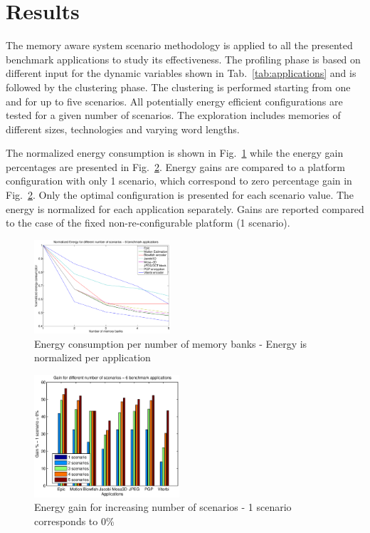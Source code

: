 \documentclass[a4paper,conference]{IEEEtran}
\begin{document}
\section{Results}
\label{sec:results}

The memory aware system scenario methodology is applied to all the presented benchmark applications to study its effectiveness. The profiling phase is based on different input for the dynamic variables shown in Tab.~\ref{tab:applications} and is followed by the clustering phase. The clustering is performed starting from one and for up to five scenarios. All potentially energy efficient configurations are tested for a given number of scenarios. The exploration includes memories of different sizes, technologies and varying word lengths. 

The normalized energy consumption is shown in Fig.~\ref{fig:energy} while the energy gain percentages are presented in Fig.~\ref{fig:gains}. Energy gains are compared to a platform configuration with only 1 scenario, which correspond to zero percentage gain in Fig.~\ref{fig:gains}. Only the optimal configuration is presented for each scenario value. The energy is normalized for each application separately. Gains are reported compared to the case of the fixed non-re-configurable platform (1 scenario).

\begin{figure}[!t]
\centering
\includegraphics[width=0.45\textwidth]{Images/6apps.eps}
\caption{Energy consumption per number of memory banks - Energy is normalized per application}
\label{fig:energy}
\end{figure}

\begin{figure}[!t]
\centering
\includegraphics[width=0.48\textwidth]{Images/6appsGains.eps}
\caption{Energy gain for increasing number of scenarios - 1 scenario corresponds to 0\%}
\label{fig:gains}
\end{figure}
\end{document}
